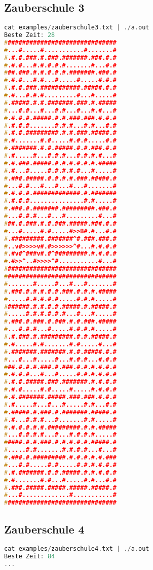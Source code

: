 \documentclass[a4paper,10pt,ngerman]{scrartcl}
\begin{document}
\subsection*{Zauberschule 3}
\begin{lstlisting}[language=C++]
cat examples/zauberschule3.txt | ./a.out
Beste Zeit: 28
###############################
#...#.....#...........#.......#
#.#.#.###.#.###.#######.###.#.#
#.#.#...#.#.#.#.#.......#...#.#
###.###.#.#.#.#.#.#######.###.#
#.#.#...#.#...#.....#.....#.#.#
#.#.#.###.###########.#####.#.#
#.#...#.#.#.........#...#.....#
#.#####.#.#.#######.###.#.#####
#...#.#...#...#.#...#...#.#...#
#.#.#.#.#####.#.#.###.###.#.#.#
#.#.#.#.......#.#.#...#.#...#.#
#.#.#.#########.#.#.###.#####.#
#.#.......#.#.....#.#.#.....#.#
#.#######.#.#.#####.#.#.###.#.#
#.#.....#...#.#.#...#.#.#.#...#
#.#.###.#####.#.#.#.#.#.#.#####
#.#...#.....#.#.#.#.#...#.....#
#.###.#####.#.#.#.#.###.#####.#
#...#.#...#...#...#...#.......#
#.#.#.#.#############.#.#######
#.#.#.#...............#.#.....#
#.###.#.#######.#########.###.#
#...#.#.#...#...#.........#...#
###.#.###.#.#.###.#####.###.#.#
#...#.....#.#.....#>>B#.#...#.#
#.#########.#######^#.###.###.#
#..v#>>>>v#.#>>>>>>^#...#.#.#.#
#.#v#^###v#.#^#########.#.#.#.#
#.#>>^..#>>>>^#...........#...#
###############################
###############################
#.......#.....#...#...#.......#
#.###.#.#.#.#.#.###.#.#.#.#####
#.....#.#.#.#.#.....#.#.#.....#
#######.#.#.#.#.#####.#.#####.#
#.....#.#.#.#.#.#...#...#.....#
#.###.#.###.#.###.#.#.###.#####
#...#.#.#...#.....#.#.#.#.....#
#.#.###.#.#########.#.#.#####.#
#.#.....#.#.......#.#.....#...#
#.#######.#######.#.#.#####.#.#
#...#...#.....#...#.#.#...#.#.#
###.#.#.#.###.#.###.#.#.#.#.#.#
#.#.#.#...#...#.....#.#.#.#.#.#
#.#.#.#####.###.#######.#.#.#.#
#.#.#.....#.#.....#.....#.#.#.#
#.#.#######.#####.###.###.#.#.#
#.#.....#...#...#.....#.#...#.#
#.#####.#.###.#.#######.#####.#
#.#...#.#.#...#.......#.#.....#
#.#.#.#.#.#.#########.#.#.#####
#...#.#.#.#...#...#.#.#.#.....#
#####.#.#.###.#.#.#.#.#.#####.#
#.....#.#.......#.#.#.#...#...#
#.###.#.#########.#.#.#.#.#.###
#...#.#.....#.#.....#.#.#.#.#.#
#.#.#######.#.#.#####.#.#.#.#.#
#.#.......#.#...#.....#.#...#.#
#.###.#####.#####.#####.#####.#
#...#.............#...........#
###############################
\end{lstlisting}
\pagebreak

\subsection*{Zauberschule 4}
\begin{lstlisting}[language=C++]
cat examples/zauberschule4.txt | ./a.out
Beste Zeit: 84
...
\end{lstlisting}
\end{document}
